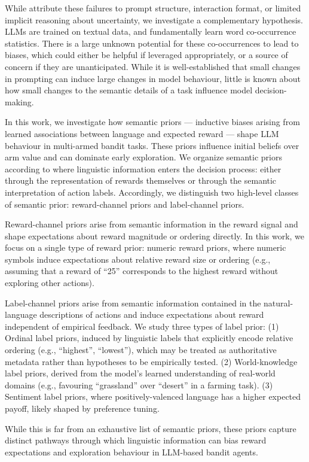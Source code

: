 \documentclass{article} %
\begin{document}
While \citet{krishna_icl} attribute these failures to prompt structure, interaction format, or limited implicit reasoning about uncertainty, we investigate a complementary hypothesis. LLMs are trained on textual data, and fundamentally learn word co-occurrence statistics. There is a large unknown potential for these co-occurrences to lead to biases, which could either be helpful if leveraged appropriately, or a source of concern if they are unanticipated. While it is well-established that small changes in prompting can induce large changes in model behaviour, little is known about how small changes to the semantic details of a task influence model decision-making.

In this work, we investigate how semantic priors — inductive biases arising from learned associations between language and expected reward — shape LLM behaviour in multi-armed bandit tasks. These priors influence initial beliefs over arm value and can dominate early exploration. We organize semantic priors according to where linguistic information enters the decision process: either through the representation of rewards themselves or through the semantic interpretation of action labels. Accordingly, we distinguish two high-level classes of semantic prior: reward-channel priors and label-channel priors.

Reward-channel priors arise from semantic information in the reward signal and shape expectations about reward magnitude or ordering directly. In this work, we focus on a single type of reward prior: numeric reward priors, where numeric symbols induce expectations about relative reward size or ordering (e.g., assuming that a reward of “25” corresponds to the highest reward without exploring other actions).

Label-channel priors arise from semantic information contained in the natural-language descriptions of actions and induce expectations about reward independent of empirical feedback. We study three types of label prior: (1) Ordinal label priors, induced by linguistic labels that explicitly encode relative ordering (e.g., “highest”, “lowest”), which may be treated as authoritative metadata rather than hypotheses to be empirically tested.
(2) World-knowledge label priors, derived from the model’s learned understanding of real-world domains (e.g., favouring “grassland” over “desert” in a farming task). (3) Sentiment label priors, where positively-valenced language has a higher expected payoff, likely shaped by preference tuning.

While this is far from an exhaustive list of semantic priors, these priors capture distinct pathways through which linguistic information can bias reward expectations and exploration behaviour in LLM-based bandit agents. 
\end{document}
